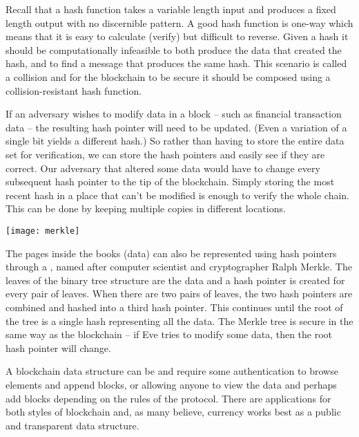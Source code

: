 Recall that a hash function takes a variable length input and produces a fixed length output with no discernible pattern. A good hash function is one-way which means that it is easy to calculate (verify) but difficult to reverse. Given a hash it should be computationally infeasible to both produce the data that created the hash, and to find a message that produces the same hash. This scenario is called a collision and for the blockchain to be secure it should be composed using a collision-resistant hash function.

If an adversary wishes to modify data in a block -- such as financial transaction data -- the resulting hash pointer will need to be updated. (Even a variation of a single bit yields a different hash.) So rather than having to store the entire data set for verification, we can store the hash pointers and easily see if they are correct. Our adversary that altered some data would have to change every subsequent hash pointer to the tip of the blockchain. Simply storing the most recent hash in a place that can't be modified is enough to verify the whole chain. This can be done by keeping multiple copies in different locations. 

\begin{center}
	\texttt{[image: merkle]}
\end{center}

The pages inside the books (data) can also be represented using hash pointers through a , named after computer scientist and cryptographer Ralph Merkle. The leaves of the binary tree structure are the data and a hash pointer is created for every pair of leaves. When there are two pairs of leaves, the two hash pointers are combined and hashed into a third hash pointer. This continues until the root of the tree is a single hash representing all the data. The Merkle tree is secure in the same way as the blockchain -- if Eve tries to modify some data, then the root hash pointer will change. 

A blockchain data structure can be  and require some authentication to browse elements and append blocks, or  allowing anyone to view the data and perhaps add blocks depending on the rules of the protocol. There are applications for both styles of blockchain and, as many believe, currency works best as a public and transparent data structure.

